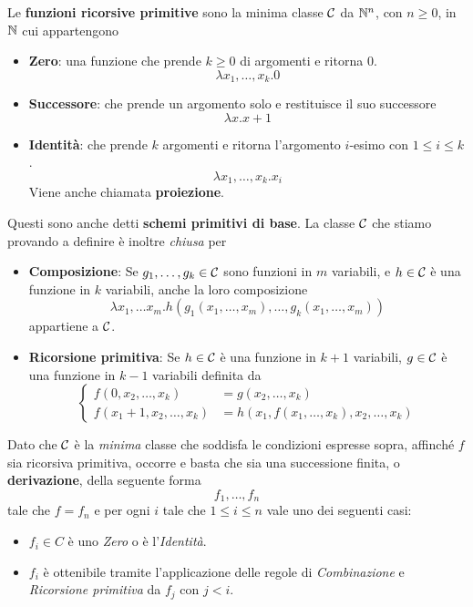 \begin{definition} \label{def: ricorsive primitive}
	Le \textbf{funzioni ricorsive primitive} sono la minima
	classe $\mathcal{C}$ da $\mathbb{N}^n$, con $n \geq 0$, in $\mathbb{N}$ cui
	appartengono
	\begin{itemize}
		\item \textbf{Zero}: una funzione che prende $k \geq 0$
		      di argomenti e ritorna 0.
		      \[ \lambda x_1, \dots, x_k . 0 \]
		\item \textbf{Successore}: che prende un argomento solo
		      e restituisce il suo successore
		      \[ \lambda x . x + 1 \]
		\item \textbf{Identità}: che prende $k$ argomenti e
		      ritorna l'argomento $i$-esimo con $1\leq i\leq k$.
		      \[ \lambda x_1, \dots, x_k . x_i \]
		      Viene anche chiamata \textbf{proiezione}.
	\end{itemize}
	Questi sono anche detti \textbf{schemi primitivi di base}.
	La classe $\mathcal{C}$ che stiamo provando a definire è inoltre
	\emph{chiusa} per
	\begin{itemize}
		\item \textbf{Composizione}: Se $g_1, \dots, g_k \in \mathcal{C}$
		      sono funzioni in $m$ variabili, e $h \in \mathcal{C}$ è
		      una funzione in $k$ variabili, anche la loro
		      composizione
		      \[
			      \lambda x_1, \dots x_m .
			      h(g_1(x_1, \dots, x_m), \dots,
			      g_k(x_1, \dots, x_m)
			      )
		      \]
		      appartiene a $\mathcal{C}$.
		\item \textbf{Ricorsione primitiva}: Se $h \in \mathcal{C}$
		      è una funzione in $k+1$ variabili, $g \in \mathcal{C}$
		      è una funzione in $k-1$ variabili definita da
		      \[
			      \begin{cases}
				      f(0, x_2, \dots, x_k)       & =
				      g(x_2, \dots, x_k)              \\
				      f(x_1 + 1, x_2, \dots, x_k) & =
				      h(x_1, f(x_1, \dots, x_k),
				      x_2, \dots, x_k)
			      \end{cases}
		      \]
	\end{itemize}
\end{definition}

\begin{tcolorbox}
	Dato che $\mathcal{C}$ è la \emph{minima} classe che soddisfa le
	condizioni espresse sopra, affinché $f$ sia ricorsiva
	primitiva, occorre e basta che sia una successione finita,
	o \textbf{derivazione}, della seguente forma
	\[ f_1, \dots, f_n \]
	tale che $f = f_n$ e per ogni $i$ tale che
	$1 \leq i \leq n$ vale uno dei seguenti casi:
	\begin{itemize}
		\item $f_i \in C$ è uno \emph{Zero} o è
		      l'\emph{Identità}.
		\item $f_i$ è ottenibile tramite l'applicazione delle
		      regole di \emph{Combinazione} e
		      \emph{Ricorsione primitiva} da $f_j$ con $j < i$.
	\end{itemize}
\end{tcolorbox}

